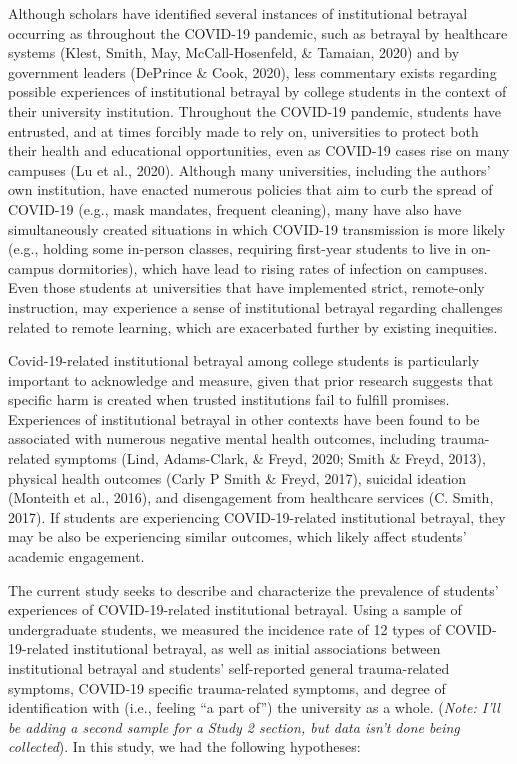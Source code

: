 \documentclass[
  english,
  man, noextraspace]{apa6}
\begin{document}
Although scholars have identified several instances of institutional betrayal occurring as throughout the COVID-19 pandemic, such as betrayal by healthcare systems (Klest, Smith, May, McCall-Hosenfeld, \& Tamaian, 2020) and by government leaders (DePrince \& Cook, 2020), less commentary exists regarding possible experiences of institutional betrayal by college students in the context of their university institution. Throughout the COVID-19 pandemic, students have entrusted, and at times forcibly made to rely on, universities to protect both their health and educational opportunities, even as COVID-19 cases rise on many campuses (Lu et al., 2020). Although many universities, including the authors' own institution, have enacted numerous policies that aim to curb the spread of COVID-19 (e.g., mask mandates, frequent cleaning), many have also have simultaneously created situations in which COVID-19 transmission is more likely (e.g., holding some in-person classes, requiring first-year students to live in on-campus dormitories), which have lead to rising rates of infection on campuses. Even those students at universities that have implemented strict, remote-only instruction, may experience a sense of institutional betrayal regarding challenges related to remote learning, which are exacerbated further by existing inequities.

Covid-19-related institutional betrayal among college students is particularly important to acknowledge and measure, given that prior research suggests that specific harm is created when trusted institutions fail to fulfill promises. Experiences of institutional betrayal in other contexts have been found to be associated with numerous negative mental health outcomes, including trauma-related symptoms (Lind, Adams-Clark, \& Freyd, 2020; Smith \& Freyd, 2013), physical health outcomes (Carly P Smith \& Freyd, 2017), suicidal ideation (Monteith et al., 2016), and disengagement from healthcare services (C. Smith, 2017). If students are experiencing COVID-19-related institutional betrayal, they may be also be experiencing similar outcomes, which likely affect students' academic engagement.

The current study seeks to describe and characterize the prevalence of students' experiences of COVID-19-related institutional betrayal. Using a sample of undergraduate students, we measured the incidence rate of 12 types of COVID-19-related institutional betrayal, as well as initial associations between institutional betrayal and students' self-reported general trauma-related symptoms, COVID-19 specific trauma-related symptoms, and degree of identification with (i.e., feeling \enquote{a part of}) the university as a whole. (\emph{Note: I'll be adding a second sample for a Study 2 section, but data isn't done being collected}). In this study, we had the following hypotheses:
\end{document}
